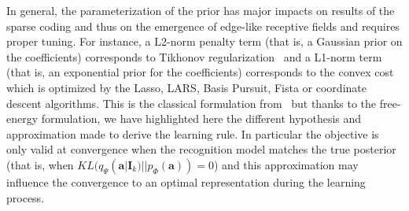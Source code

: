 \documentclass[a4paper, 11pt, draft]{article} %
\newcommand{\coef}{\mathbf{a}} %
\newcommand{\image}{\mathbf{I}} %
\newcommand{\dico}{\Phi} %
\begin{document}
In general, the parameterization of the prior has major impacts on results of the sparse coding and thus on the emergence of edge-like receptive fields and requires proper tuning. For instance, a L2-norm penalty term (that is, a Gaussian prior on the coefficients) corresponds to Tikhonov regularization~\citep{Tikhonov77} and a L1-norm term (that is, an exponential prior for the coefficients) corresponds to the convex cost which is optimized by the Lasso, LARS, Basis Pursuit, Fista or coordinate descent algorithms. %
This is the classical formulation from~\citet{Olshausen97} but thanks to the free-energy formulation,  we have highlighted here the different hypothesis and approximation made to derive the learning rule. In particular the objective is only valid at convergence when the recognition model matches the true posterior (that is, when $KL( q_\Psi(\coef | \image_k) || p_\dico(\coef) )=0$) and this approximation may influence the convergence to an optimal representation during the learning process.%

\end{document}
